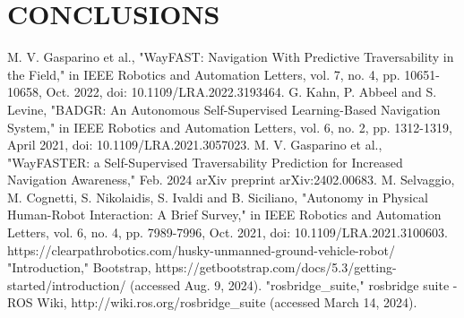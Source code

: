 \documentclass[letterpaper, 10 pt, conference]{ieeeconf}  %
\begin{document}
\section{CONCLUSIONS}


\addtolength{\textheight}{-12cm}   %











\begin{thebibliography}{99}

 M. V. Gasparino et al., "WayFAST: Navigation With Predictive Traversability in the Field," in IEEE Robotics and Automation Letters, vol. 7, no. 4, pp. 10651-10658, Oct. 2022, doi: 10.1109/LRA.2022.3193464.
 G. Kahn, P. Abbeel and S. Levine, "BADGR: An Autonomous Self-Supervised Learning-Based Navigation System," in IEEE Robotics and Automation Letters, vol. 6, no. 2, pp. 1312-1319, April 2021, doi: 10.1109/LRA.2021.3057023.
 M. V. Gasparino et al., "WayFASTER: a Self-Supervised Traversability Prediction for Increased Navigation Awareness," Feb. 2024 arXiv preprint arXiv:2402.00683.
 M. Selvaggio, M. Cognetti, S. Nikolaidis, S. Ivaldi and B. Siciliano, "Autonomy in Physical Human-Robot Interaction: A Brief Survey," in IEEE Robotics and Automation Letters, vol. 6, no. 4, pp. 7989-7996, Oct. 2021, doi: 10.1109/LRA.2021.3100603.
https://clearpathrobotics.com/husky-unmanned-ground-vehicle-robot/
"Introduction," Bootstrap, https://getbootstrap.com/docs/5.3/getting-started/introduction/ (accessed Aug. 9, 2024).
"rosbridge\_suite," rosbridge suite - ROS Wiki, http://wiki.ros.org/rosbridge\_suite (accessed March 14, 2024).






\end{thebibliography}
\end{document}
